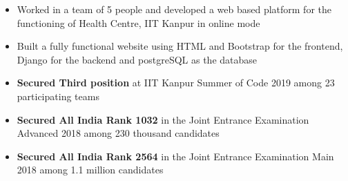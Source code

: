 \documentclass[10pt,a4paper,ragged2e]{altacv}
\begin{document}



\begin{fullwidth}
\makecvheader
\end{fullwidth}


\vspace{-0.4cm}

\begin{itemize}
\item Worked in a team of 5 people and developed a web based platform for the functioning of Health Centre, IIT Kanpur in online mode
\item Built a fully functional website using HTML and Bootstrap for the frontend, Django for the backend and postgreSQL as the database
\end{itemize}


\smallskip
\begin{itemize}
\item \textbf{Secured Third position} at IIT Kanpur Summer of Code 2019 among 23 participating teams
\item \textbf{Secured All India Rank 1032} in the Joint Entrance Examination Advanced 2018 among 230 thousand candidates
\item \textbf{Secured All India Rank 2564} in the Joint Entrance Examination Main 2018 among 1.1 million candidates
\end{itemize}
\end{document}
